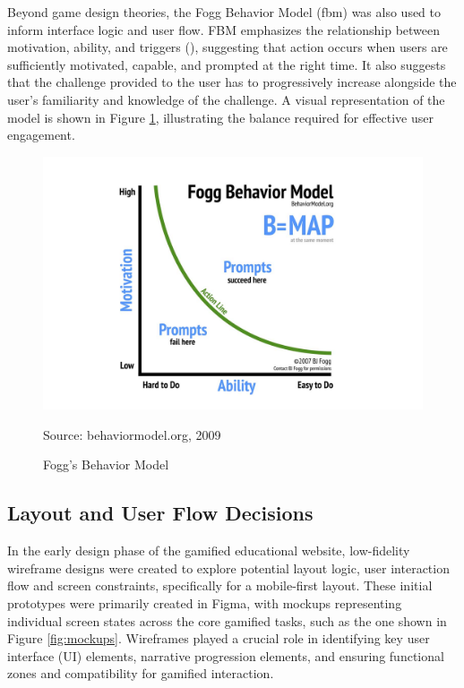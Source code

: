 Beyond game design theories, the Fogg Behavior Model (\acrshort{fbm}) was also used to inform interface logic and user flow. 
FBM emphasizes the relationship between motivation, ability, and triggers (\cite{fogg}), suggesting that action occurs when users are sufficiently motivated, capable, and prompted at the right time. 
It also suggests that the challenge provided to the user has to progressively increase alongside the user's familiarity and knowledge of the challenge. 
A visual representation of the model is shown in Figure \ref{fig:foggChart}, illustrating the balance required for effective user engagement.
\begin{figure}[htbp]
 \centering
 \includegraphics[width=14cm]{Media/Fogg-Behavior-Model.jpg}
 \caption{Fogg's Behavior Model}
 \label{fig:foggChart}
 {\raggedright \small{Source:} behaviormodel.org, 2009\par}
\end{figure}

\subsection{Layout and User Flow Decisions}
In the early design phase of the gamified educational website, low-fidelity wireframe designs were created to explore potential layout logic, user interaction flow and screen constraints, specifically for a mobile-first layout. 
These initial prototypes were primarily created in Figma, with mockups representing individual screen states across the core gamified tasks, such as the one shown in Figure \ref {fig:mockups}. 
Wireframes played a crucial role in identifying key user interface (UI) elements, narrative progression elements, and ensuring functional zones and compatibility for gamified interaction.


